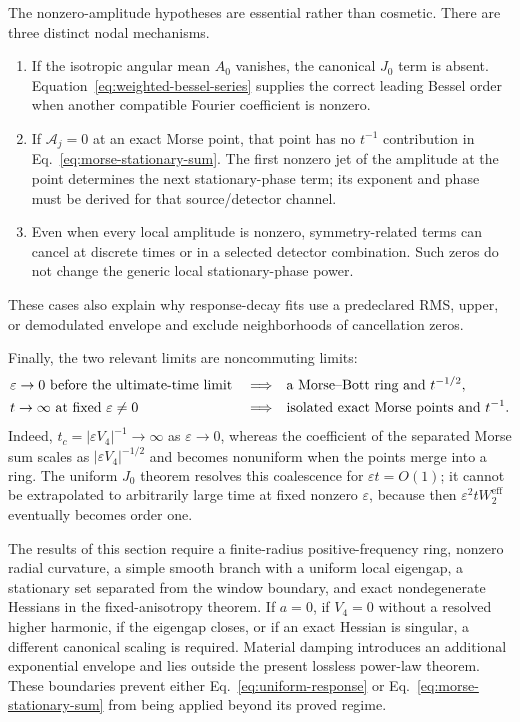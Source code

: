 The nonzero-amplitude hypotheses are essential rather than cosmetic.
There are three distinct nodal mechanisms.
\begin{enumerate}
  \item If the isotropic angular mean \(A_0\) vanishes, the canonical
        \(J_0\) term is absent.  Equation~\eqref{eq:weighted-bessel-series}
        supplies the correct leading Bessel order when another compatible
        Fourier coefficient is nonzero.
  \item If \(\mathcal A_j=0\) at an exact Morse point, that point has no
        \(t^{-1}\) contribution in Eq.~\eqref{eq:morse-stationary-sum}.
        The first nonzero jet of the amplitude at the point determines the
        next stationary-phase term; its exponent and phase must be derived
        for that source/detector channel.
  \item Even when every local amplitude is nonzero, symmetry-related terms
        can cancel at discrete times or in a selected detector combination.
        Such zeros do not change the generic local stationary-phase power.
\end{enumerate}
These cases also explain why response-decay fits use a predeclared RMS,
upper, or demodulated envelope and exclude neighborhoods of cancellation
zeros.

Finally, the two relevant limits are noncommuting limits:
\label{rem:noncommuting-limits}
\begin{align}
  &\varepsilon\to0\ \text{before the ultimate-time limit}
    &&\Longrightarrow&&
    \text{a Morse--Bott ring and }t^{-1/2},                         \notag\\
  &t\to\infty\ \text{at fixed }\varepsilon\ne0
    &&\Longrightarrow&&
    \text{isolated exact Morse points and }t^{-1}.
  \label{eq:noncommuting-green-limits}
\end{align}
Indeed, \(t_c=|\varepsilon V_4|^{-1}\to\infty\) as
\(\varepsilon\to0\), whereas the coefficient of the separated Morse sum
scales as \(|\varepsilon V_4|^{-1/2}\) and becomes nonuniform when the
points merge into a ring.  The uniform \(J_0\) theorem resolves this
coalescence for \(\varepsilon t=O(1)\); it cannot be extrapolated to
arbitrarily large time at fixed nonzero \(\varepsilon\), because then
\(\varepsilon^2tW_2^{\mathrm{eff}}\) eventually becomes order one.

The results of this section require a finite-radius positive-frequency
ring, nonzero radial curvature, a simple smooth branch with a uniform local
eigengap, a stationary set separated from the window boundary, and exact
nondegenerate Hessians in the fixed-anisotropy theorem.  If \(a=0\), if
\(V_4=0\) without a resolved higher harmonic, if the eigengap closes, or if
an exact Hessian is singular, a different canonical scaling is required.
Material damping introduces an additional exponential envelope and lies
outside the present lossless power-law theorem.  These boundaries prevent
either Eq.~\eqref{eq:uniform-response} or
Eq.~\eqref{eq:morse-stationary-sum} from being applied beyond its proved
regime.
